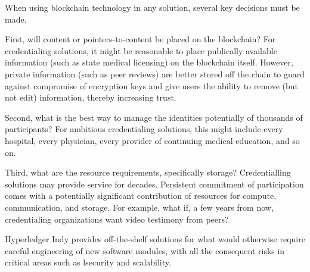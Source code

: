 When using blockchain technology in any solution, several key decisions must be made.

First, will content or pointers-to-content be placed on the blockchain?  For credentialing
solutions, it might be reasonable to place publically available information (such as state medical
licensing) on the blockchain itself.  However, private information (such as peer reviews) are better
stored off the chain to guard against compromise of encryption keys and give users the ability to
remove (but not edit) information, thereby increasing trust.

Second, what is the best way to manage the identities potentially of thousands of participants?  For
ambitious credentialing solutions, this might include every hospital, every physician, every
provider of continuing medical education, and so on.

Third, what are the resource requirements, specifically storage? Credentialling solutions may
provide service for decades. Persistent commitment of participation comes with a potentially
significant contribution of resources for compute, communication, and storage. For example, what if,
a few years from now, credentialing organizations want video testimony from peers?

Hyperledger Indy provides off-the-shelf solutions for what would otherwise require careful
engineering of new software modules, with all the consequent risks in critical areas such as
lsecurity and scalability.

